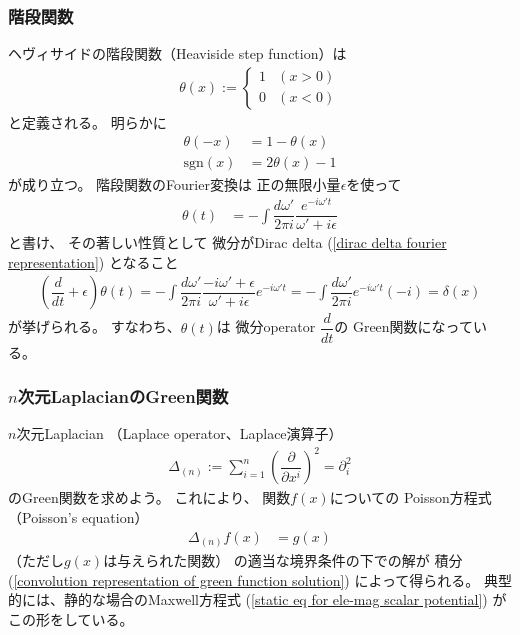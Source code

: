 \subsubsection{階段関数}

ヘヴィサイドの階段関数（Heaviside step function）は
\begin{align}
    \theta(x)
    :=
    \begin{cases}
        1 & (x > 0)
    \\
        0 & (x < 0)
    \end{cases}
\label{definition of step function}
\end{align}
と定義される。
明らかに
\begin{subequations}
\begin{align}
    \theta(- x) &= 1 - \theta(x)
\\
    \mathrm{sgn}(x)
    &=
    2 \theta(x) - 1
\label{step function and sign}
\end{align}
\end{subequations}
が成り立つ。
階段関数のFourier変換は
正の無限小量$\epsilon$を使って
\begin{align}
  \theta(t)
  &=
    - \int\dfrac{d \omega'}{2 \pi i}
    \dfrac{e^{- i \omega' t}}{\omega' + i \epsilon}
\label{fourier transformation of step function}
\end{align}
と書け、
その著しい性質として
微分がDirac delta
(\ref{dirac delta fourier representation})
となること
\begin{align}
    \left(
        \dfrac{d}{dt}
        +
        \epsilon
    \right)
    \theta(t)
=
    - \int\dfrac{d \omega'}{2 \pi i}
    \dfrac{
        - i \omega' + \epsilon
    }{\omega' + i \epsilon}
    e^{- i \omega' t}
=
    - \int\dfrac{d \omega'}{2 \pi i}
    e^{- i \omega' t}
    ( - i)
=
    \delta(x)
\label{derivative of step function}
\end{align}
が挙げられる。
すなわち、$\theta(t)$は
微分operator $\dfrac{d}{dt}$の
Green関数になっている。

\subsubsection{$n$次元LaplacianのGreen関数}

$n$次元Laplacian
（Laplace operator、Laplace演算子）
\begin{align}
    \Delta_{(n)}
    :=
    \sum_{i=1}^n
    \left(
        \dfrac{\partial}{\partial x^i}
    \right)^2
    =
    \partial_i^2
\end{align}
のGreen関数を求めよう。
これにより、
関数$f(x)$についての
Poisson方程式（Poisson's equation）
\begin{align}
    \Delta_{(n)} f(x)
    &= g(x)
\label{poisson eq}
\end{align}
（ただし$g(x)$は与えられた関数）
の適当な境界条件の下での解が
積分
(\ref{convolution representation of green function solution})
によって得られる。
典型的には、静的な場合のMaxwell方程式
(\ref{static eq for ele-mag scalar potential})
がこの形をしている。

